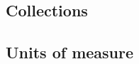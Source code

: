 \documentclass[10pt]{sigplanconf}
\begin{document}
\subsection{Collections}
\label{sec:more-collections}

\subsection{Units of measure}
\label{sec:more-units}



\newpage
~
\newpage












































\end{document}

